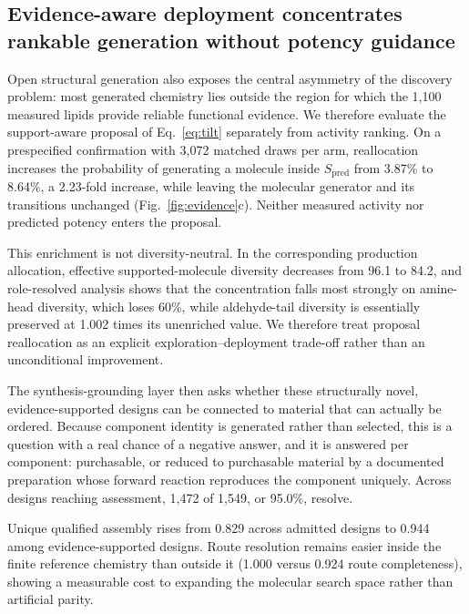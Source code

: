 \documentclass{article}
\newcommand{\ResolveRate}{95.0\%}
\newcommand{\ResolveN}{1{,}472}
\newcommand{\ResolveDen}{1{,}549}
\newcommand{\MeasuredLipids}{1{,}100}
\newcommand{\YieldBroad}{3.87\%}
\newcommand{\YieldEnriched}{8.64\%}
\newcommand{\YieldRatio}{2.23}
\newcommand{\EffSupportedPrior}{96.1}         %
\newcommand{\EffSupportedEnriched}{84.2}
\newcommand{\ArmBudget}{3{,}072}
\newcommand{\UniqueAdmitted}{0.829}
\newcommand{\UniqueSupported}{0.944}
\newcommand{\RouteInside}{1.000}
\newcommand{\RouteOutside}{0.924}
\newcommand{\AmineDiversityDrop}{60\%}        %
\newcommand{\AldehydeDiversityRatio}{1.002}   %
\newcommand{\Spred}{\ensuremath{S_{\mathrm{pred}}}}
\begin{document}
\subsection{Evidence-aware deployment concentrates rankable generation without potency guidance}
\label{sec:res-deployment}
Open structural generation also exposes the central asymmetry of the discovery problem: most generated
chemistry lies outside the region for which the \MeasuredLipids{} measured lipids provide reliable
functional evidence. We therefore evaluate the support-aware proposal of Eq.~\eqref{eq:tilt}
separately from activity ranking. On a prespecified confirmation with \ArmBudget{} matched
draws per arm, reallocation increases the probability of generating a molecule inside \Spred{} from
\YieldBroad{} to \YieldEnriched{}, a \YieldRatio{}-fold increase, while
leaving the molecular generator and its transitions unchanged (Fig.~\ref{fig:evidence}c). Neither
measured activity nor predicted potency enters the proposal.

This enrichment is not diversity-neutral. In the corresponding production allocation, effective
supported-molecule diversity decreases from \EffSupportedPrior{} to
\EffSupportedEnriched{}, and role-resolved analysis shows that the concentration falls most
strongly on amine-head diversity, which loses \AmineDiversityDrop{}, while aldehyde-tail diversity is
essentially preserved at \AldehydeDiversityRatio{} times its unenriched value. We therefore treat
proposal reallocation as an explicit exploration--deployment trade-off rather than an unconditional
improvement.

The synthesis-grounding layer then asks whether these structurally novel, evidence-supported designs
can be connected to material that can actually be ordered. Because component identity is generated
rather than selected, this is a question with a real chance of a negative answer, and it is answered
per component: purchasable, or reduced to purchasable material by a documented preparation whose
forward reaction reproduces the component uniquely. Across designs reaching assessment,
\ResolveN{} of \ResolveDen{}, or \ResolveRate{}, resolve.

Unique qualified assembly rises from \UniqueAdmitted{} across admitted designs to
\UniqueSupported{} among evidence-supported designs. Route resolution remains easier inside
the finite reference chemistry than outside it (\RouteInside{} versus \RouteOutside{}
route completeness), showing a measurable cost to expanding the molecular search space rather than
artificial parity.
\end{document}

